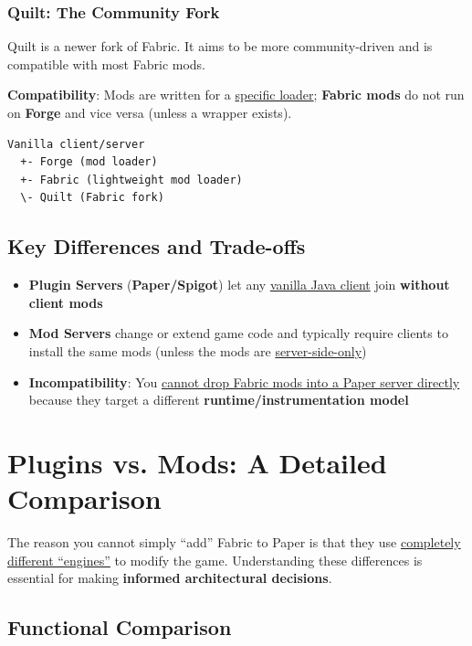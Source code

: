\documentclass{article}
\begin{document}
\subsubsection{Quilt: The Community Fork}

Quilt is a newer fork of Fabric. It aims to be more community-driven and is compatible with most Fabric mods.

\textbf{Compatibility}: Mods are written for a \uline{specific loader}; \textbf{Fabric mods} do not run on \textbf{Forge} and vice versa (unless a wrapper exists).

\begin{verbatim}
Vanilla client/server
  +- Forge (mod loader)
  +- Fabric (lightweight mod loader)
  \- Quilt (Fabric fork)
\end{verbatim}

\newpage
\subsection{Key Differences and Trade-offs}

\begin{itemize}
    \item \textbf{Plugin Servers} (\textbf{Paper/Spigot}) let any \uline{vanilla Java client} join \textbf{without client mods}
    \item \textbf{Mod Servers} change or extend game code and typically require clients to install the same mods (unless the mods are \uline{server-side-only})
    \item \textbf{Incompatibility}: You \uline{cannot drop Fabric mods into a Paper server directly} because they target a different \textbf{runtime/instrumentation model}
\end{itemize}

\section{Plugins vs. Mods: A Detailed Comparison}

The reason you cannot simply ``add'' Fabric to Paper is that they use \uline{completely different ``engines''} to modify the game. Understanding these differences is essential for making \textbf{informed architectural decisions}.

\subsection{Functional Comparison}
\end{document}
